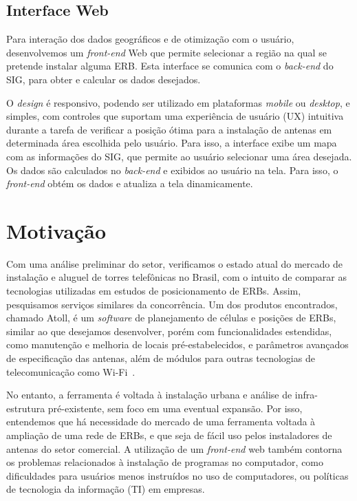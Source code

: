 \documentclass[]{politex}
\begin{document}
\subsection{Interface Web}

Para interação dos dados geográficos e de otimização com o usuário,
desenvolvemos um \textit{front-end} Web que permite selecionar a região na qual
se pretende instalar alguma ERB. Esta interface se comunica com o
\textit{back-end} do SIG, para obter e calcular os dados desejados.

O \textit{design} é responsivo, podendo ser utilizado em plataformas
\textit{mobile} ou \textit{desktop}, e simples, com controles que suportam uma
experiência de usuário (UX) intuitiva durante a tarefa de verificar a posição
ótima para a instalação de antenas em determinada área escolhida pelo usuário.
Para isso, a interface exibe um mapa com as informações do SIG, que permite ao
usuário selecionar uma área desejada. Os dados são calculados no
\textit{back-end} e exibidos ao usuário na tela. Para isso, o \textit{front-end}
obtém os dados e atualiza a tela dinamicamente.

\section{Motivação}

Com uma análise preliminar do setor, verificamos o estado atual do mercado de
instalação e aluguel de torres telefônicas no Brasil, com o intuito de comparar
as tecnologias utilizadas em estudos de posicionamento de ERBs. Assim,
pesquisamos serviços similares da concorrência. Um dos produtos encontrados,
chamado Atoll, é um \textit{software} de planejamento de células e posições de
ERBs, similar ao que desejamos desenvolver, porém com funcionalidades
estendidas, como manutenção e melhoria de locais pré-estabelecidos, e parâmetros
avançados de especificação das antenas, além de módulos para outras tecnologias
de telecomunicação como Wi-Fi~\cite{atoll}.

No entanto, a ferramenta é voltada à instalação urbana e análise de
infra-estrutura pré-existente, sem foco em uma eventual expansão. Por isso,
entendemos que há necessidade do mercado de uma ferramenta voltada à ampliação
de uma rede de ERBs, e que seja de fácil uso pelos instaladores de antenas do
setor comercial. A utilização de um \textit{front-end} web também contorna os
problemas relacionados à instalação de programas no computador, como
dificuldades para usuários menos instruídos no uso de computadores, ou políticas
de tecnologia da informação (TI) em empresas.
\end{document}
